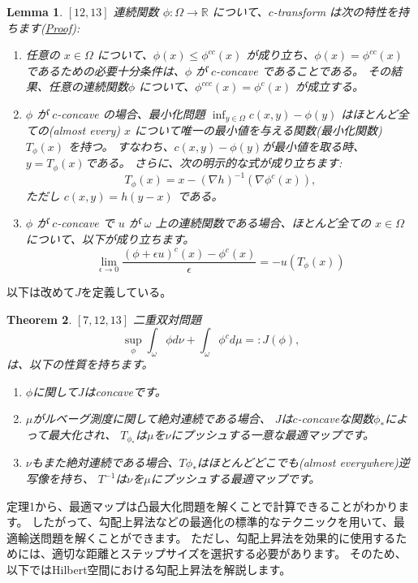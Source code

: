 \documentclass{jsarticle}
\newtheorem{thm}{Theorem}[section]
\newtheorem{lem}[thm]{Lemma}
\theoremstyle{definition}
\begin{document}
\begin{lem}
  \label{lem:c-transform}
  $\left[ 12, 13 \right]$
  連続関数 $\phi: \Omega \to \mathbb{R}$ について、$c$-transform は次の特性を持ちます(\hyperlink{proof:lem:c-transform}{Proof}):
  \begin{enumerate}
  \item 任意の $x \in \Omega$ について、$\phi(x) \le \phi^{cc}(x)$ が成り立ち、$\phi(x) = \phi^{cc}(x)$ であるための必要十分条件は、$\phi$ が $c$-concave であることである。
  その結果、任意の連続関数$\phi$ について、$\phi^{ccc}(x) = \phi^{c}(x)$ が成立する。
  
  \item $\phi$ が $c$-concave の場合、最小化問題 $\inf_{y \in \Omega} c(x, y) - \phi(y)$ はほとんど全ての(almost every) $x$ について唯一の最小値を与える関数(最小化関数) $T_\phi(x)$ を持つ。
  すなわち、$c(x, y) - \phi(y)$が最小値を取る時、 $y = T_\phi(x)$である。
  さらに、次の明示的な式が成り立ちます:
  \begin{equation*}
    T_\phi(x) = x - (\nabla h)^{-1}(\nabla \phi^c(x)),
  \end{equation*}
  ただし $c(x, y) = h(y - x)$ である。
  
  \item $\phi$ が $c$-concave で $u$ が $\omega$ 上の連続関数である場合、ほとんど全ての $x \in \Omega$ について、以下が成り立ちます。
  \begin{equation*}
    \label{eq:c-transform lim}
    \lim_{\epsilon \to 0} \frac{(\phi + \epsilon u)^c(x) - \phi^c(x)}{\epsilon} = - u(T_\phi(x)) 
  \end{equation*}
  \end{enumerate}
\end{lem}

以下は改めて$J$を定義している。
{\color{teal}
\begin{thm}
  $\left[ 7,12,13 \right]$ 
  二重双対問題
  \begin{equation*}
    \sup_\phi \int_\omega \phi  d \nu + \int_\omega \phi^c  d \mu =: J(\phi),
  \end{equation*}
  は、以下の性質を持ちます。

  \begin{enumerate}
    \item $\phi$に関して$J$はconcaveです。
    
    \item $\mu$がルベーグ測度に関して絶対連続である場合、
    $J$は$c$-concaveな関数$\phi_*$によって最大化され、
    $T_{\phi_*}$は$\mu$を$\nu$にプッシュする一意な最適マップです。
    
    \item $\nu$もまた絶対連続である場合、$T\phi_*$はほとんどどこでも(almost everywhere)逆写像を持ち、
    $T^{-1}$は$\nu$を$\mu$にプッシュする最適マップです。
  \end{enumerate}
\end{thm}
}
定理1から、最適マップは凸最大化問題を解くことで計算できることがわかります。
したがって、勾配上昇法などの最適化の標準的なテクニックを用いて、最適輸送問題を解くことができます。
ただし、{\color{red}勾配上昇法を効果的に使用するためには、適切な距離とステップサイズを選択する必要があります。}
そのため、以下ではHilbert空間における勾配上昇法を解説します。
\end{document}
